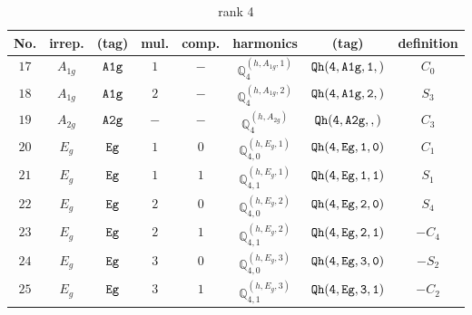 \documentclass[fleqn,8pt]{jsarticle}
\begin{document}
\begin{table}[ht!]
\begin{center}
\caption{rank 4}
\renewcommand{\arraystretch}{1.3}
\begin{tabular}{cccccccc} \hline \hline
No. & irrep. & (tag) & mul. & comp. & harmonics & (tag) & definition \\ \hline
$ 17 $ & $ A_{1g} $ & $ {\tt A1g} $ & $ 1 $ & $ - $ & $ \mathbb{Q}_{4}^{(h,A_{1g},1)} $ & $ {\tt Qh(4,A1g,1,)} $ & $ C_{0} $ \\
$ 18 $ & $ A_{1g} $ & $ {\tt A1g} $ & $ 2 $ & $ - $ & $ \mathbb{Q}_{4}^{(h,A_{1g},2)} $ & $ {\tt Qh(4,A1g,2,)} $ & $ S_{3} $ \\
$ 19 $ & $ A_{2g} $ & $ {\tt A2g} $ & $ - $ & $ - $ & $ \mathbb{Q}_{4}^{(h,A_{2g})} $ & $ {\tt Qh(4,A2g,,)} $ & $ C_{3} $ \\
$ 20 $ & $ E_{g} $ & $ {\tt Eg} $ & $ 1 $ & $ 0 $ & $ \mathbb{Q}_{4,0}^{(h,E_{g},1)} $ & $ {\tt Qh(4,Eg,1,0)} $ & $ C_{1} $ \\
$ 21 $ & $ E_{g} $ & $ {\tt Eg} $ & $ 1 $ & $ 1 $ & $ \mathbb{Q}_{4,1}^{(h,E_{g},1)} $ & $ {\tt Qh(4,Eg,1,1)} $ & $ S_{1} $ \\
$ 22 $ & $ E_{g} $ & $ {\tt Eg} $ & $ 2 $ & $ 0 $ & $ \mathbb{Q}_{4,0}^{(h,E_{g},2)} $ & $ {\tt Qh(4,Eg,2,0)} $ & $ S_{4} $ \\
$ 23 $ & $ E_{g} $ & $ {\tt Eg} $ & $ 2 $ & $ 1 $ & $ \mathbb{Q}_{4,1}^{(h,E_{g},2)} $ & $ {\tt Qh(4,Eg,2,1)} $ & $ - C_{4} $ \\
$ 24 $ & $ E_{g} $ & $ {\tt Eg} $ & $ 3 $ & $ 0 $ & $ \mathbb{Q}_{4,0}^{(h,E_{g},3)} $ & $ {\tt Qh(4,Eg,3,0)} $ & $ - S_{2} $ \\
$ 25 $ & $ E_{g} $ & $ {\tt Eg} $ & $ 3 $ & $ 1 $ & $ \mathbb{Q}_{4,1}^{(h,E_{g},3)} $ & $ {\tt Qh(4,Eg,3,1)} $ & $ - C_{2} $ \\
 \hline \hline
\end{tabular}
\end{center}
\end{table}
\end{document}
